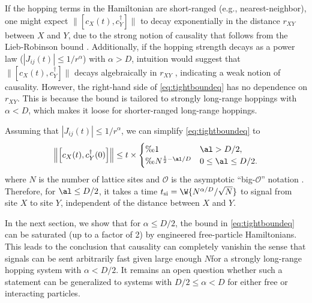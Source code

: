 If the hopping terms in the Hamiltonian are short-ranged (e.g., nearest-neighbor), one might expect $\|[c_{X}(t),c_{Y}^{\dagger}]\|$ to decay exponentially in the distance $r_{XY}$ between $X$ and $Y$, due to the strong notion of causality that follows from the Lieb-Robinson bound \cite{LR}.
Additionally, if the hopping strength decays as a power law ($|J_{ij}(t)|\le 1/r^{\alpha}$) with $\alpha>D$, intuition would suggest that $\|[c_{X}(t),c_{Y}^{\dagger}]\|$ decays algebraically in $r_{XY}$ \cite{HK,Gong14}, indicating a weak notion of causality.
However, the right-hand side of \cref{eq:tightboundeq} has no dependence on $r_{XY}$.
This is because the bound is tailored to strongly long-range hoppings with $\alpha<D$, which makes it loose for shorter-ranged long-range hoppings.

Assuming that $|J_{ij}(t)|\le 1/r^{\alpha}$, we can simplify \cref{eq:tightboundeq} to
\begin{equation}
\left\Vert \left[c_{X}(t),c_{Y}^{\dagger}(0)\right]\right\Vert \le t\times\begin{cases}
\O{1} & \al > D/2,\\
\O{N^{\frac{1}{2}-\al/D}} & 0\le \al\le D/2.
\end{cases}\label{eq:corollary}
\end{equation}
where $N$ is the number of lattice sites and $\mathcal{O}$ is the asymptotic ``big-$\mathcal{O}$'' notation \cite{bigO}. Therefore, for $\al\le D/2$, it takes a time $t_\text{si} = \W{N^{\alpha/D}/\sqrt{N}}$ \cite{bigO} to signal from site $X$ to site $Y$, independent of the distance between $X$ and $Y$.

In the next section, we show that for $\alpha\le D/2$, the bound in \cref{eq:tightboundeq} can be saturated (up to a factor of 2) by engineered free-particle Hamiltonians.
This leads to the conclusion that causality can completely vanish\dash in the sense that signals can be sent arbitrarily fast given large enough $N$\dash for a strongly long-range hopping system with $\alpha<D/2$.
It remains an open question whether such a statement can be generalized to systems with $D/2 \le\alpha<D$ for either free or interacting particles.


